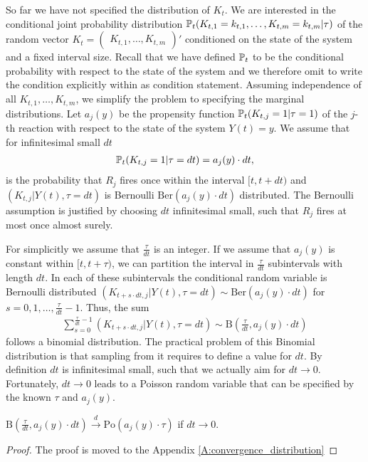 So far we have not specified the distribution of $K_t$. We are interested in the conditional joint probability distribution $\mathbb{P}_t(K_{t,1} = k_{t,1}, \dots, K_{t,m} = k_{t,m}|\tau)$ of the random vector $K_t = \begin{pmatrix}
K_{t,1}, \dots, K_{t,m} \end{pmatrix}'$ conditioned on the state of the system and a fixed interval size. Recall that we have defined $\mathbb{P}_t$ to be the conditional probability with respect to the state of the system and we therefore omit to write the condition explicitly within as condition statement. Assuming independence of all $K_{t, 1},\hdots, K_{t, m}$, we simplify the problem to specifying the marginal distributions. Let $a_j(y)$ be the propensity function $\mathbb{P}_t(K_{t,j}=1|\tau=1)$ of the $j$-th reaction with respect to the state of the system $Y(t)=y$. We assume that for infinitesimal small $dt$
\begin{align}
\mathbb{P}_t(K_{t,j} = 1|\tau = dt) = a_j(y) \cdot dt,
\end{align}
is the probability that $R_j$ fires once within the interval $[t, t+dt)$ and $\left(K_{t,j}|Y(t), \tau =dt \right)$ is Bernoulli $\mathrm{Ber}(a_j(y) \cdot dt)$ distributed. The Bernoulli assumption is justified by choosing $dt$ infinitesimal small, such that $R_j$ fires at most once almost surely.

For simplicitly we assume that $\frac{\tau}{dt}$ is an integer. If we assume that $a_j(y)$ is constant within $[t, t+\tau)$, we can partition the interval in $\frac{\tau}{dt}$ subintervals with length $dt$. In each of these subintervals the conditional random variable is Bernoulli distributed $\left(K_{t+s \cdot dt,j}|Y(t), \tau =dt\right) \sim \mathrm{Ber}(a_j(y) \cdot dt)$ for $s=0, 1, \dots, \frac{\tau}{dt} - 1$. Thus, the sum
\begin{align}
\sum_{s=0}^{\frac{\tau}{dt}-1} \left(K_{t+s \cdot dt, j} | Y(t), \tau = dt\right) \sim \textrm{B}\left(\frac{\tau}{dt}, a_j(y) \cdot dt\right)
\end{align}
follows a binomial distribution. The practical problem of this Binomial distribution is that sampling from it requires to define a value for $dt$. By definition $dt$ is infinitesimal small, such that we actually aim for $dt \to 0$. Fortunately, $dt \to 0$ leads to a Poisson random variable that can be specified by the known $\tau$ and $a_j(y)$.
\begin{theorem}
$\textrm{B}\left(\frac{\tau}{dt}, a_j(y) \cdot dt\right) \xrightarrow{d} \textrm{Po}(a_j(y) \cdot \tau)$ if $dt \to 0$.
\end{theorem}
\begin{proof}
The proof is moved to the Appendix \ref{A:convergence_distribution}
\end{proof}

